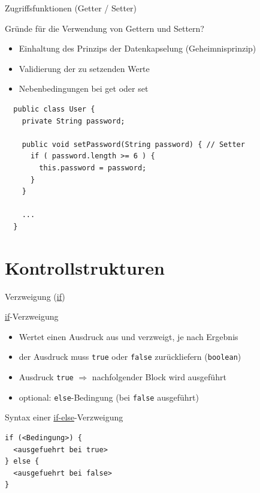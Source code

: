 \documentclass[18pt]{beamer}
\begin{document}
\begin{frame}[fragile]{Zugriffsfunktionen (Getter / Setter)}
	\begin{block}{Gründe für die Verwendung von Gettern und Settern?}
    \begin{itemize}
      \item Einhaltung des Prinzips der Datenkapselung (Geheimnisprinzip)
      \pause
      \item Validierung der zu setzenden Werte
      \pause
      \item Nebenbedingungen bei get oder set
    \end{itemize}
    \end{block}
    \pause
    \begin{lstlisting}
  public class User {   
    private String password;
    
    public void setPassword(String password) { // Setter
      if ( password.length >= 6 ) {
        this.password = password;
      }
    }
    
    ...
  }\end{lstlisting}
\end{frame}


\section{Kontrollstrukturen}
\begin{frame}[fragile]{Verzweigung (\url{if})}
  \begin{block}{\url{if}-Verzweigung}
    \begin{itemize}
      \item Wertet einen Ausdruck aus und verzweigt, je nach Ergebnis
      \item der Ausdruck muss \lstinline$true$ oder \lstinline$false$ zurückliefern (\lstinline$boolean$)
      \item Ausdruck \lstinline$true$ $\Rightarrow$ nachfolgender Block wird ausgeführt
      \item optional: \lstinline$else$-Bedingung (bei \lstinline$false$ ausgeführt)
    \end{itemize}
  \end{block}
  Syntax einer \url{if-else}-Verzweigung
  \begin{lstlisting}
if (<Bedingung>) {
  <ausgefuehrt bei true>
} else {
  <ausgefuehrt bei false>
}
\end{lstlisting}   
\end{frame}
\end{document}

